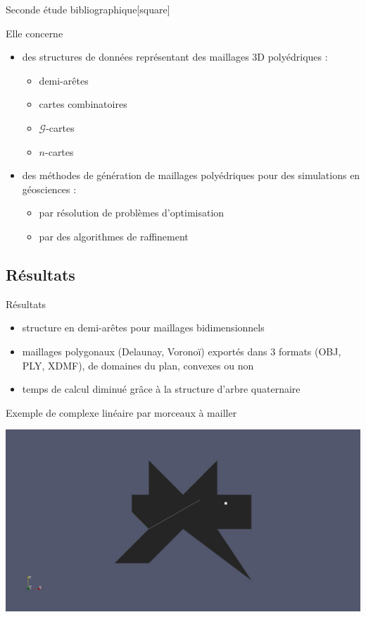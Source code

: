 \documentclass[aspectratio=169, 12pt, a4paper, hyperref={pdfauthor={Alexandre MARIN}, pdfkeywords={IFPEN, Delaunay, Voronoi, mesh generation}, colorlinks=true, linkcolor=purple, urlcolor=blue, citecolor=magenta}]{beamer}
\begin{document}
\begin{Energie}{Seconde étude bibliographique}[square]

Elle concerne

\begin{itemize}
\item des structures de données représentant des maillages 3D polyédriques :
\begin{itemize}
\item demi-arêtes
\item cartes combinatoires
\item $\mathcal{G}$-cartes
\item $n$-cartes
\end{itemize}
\item des méthodes de génération de maillages polyédriques pour des simulations en géosciences :
\begin{itemize}
\item par résolution de problèmes d'optimisation
\item par des algorithmes de raffinement
\end{itemize}
\end{itemize}
\end{Energie}

\subsection{Résultats}
\begin{Energie}{Résultats}
\begin{itemize}
\item structure en demi-arêtes pour maillages bidimensionnels
\item maillages polygonaux (Delaunay, Voronoï) exportés dans $3$ formats (OBJ, PLY, XDMF), de domaines du plan, convexes ou non
\item temps de calcul diminué grâce à la structure d'arbre quaternaire
\end{itemize}
\end{Energie}

\begin{Energie}{\normalsize Exemple de complexe linéaire par morceaux à mailler}
\begin{center}
\includegraphics[scale=0.25, viewport=620 250 1550 950, clip]{odd_plc.jpg}
\end{center}
\end{Energie}
\end{document}
